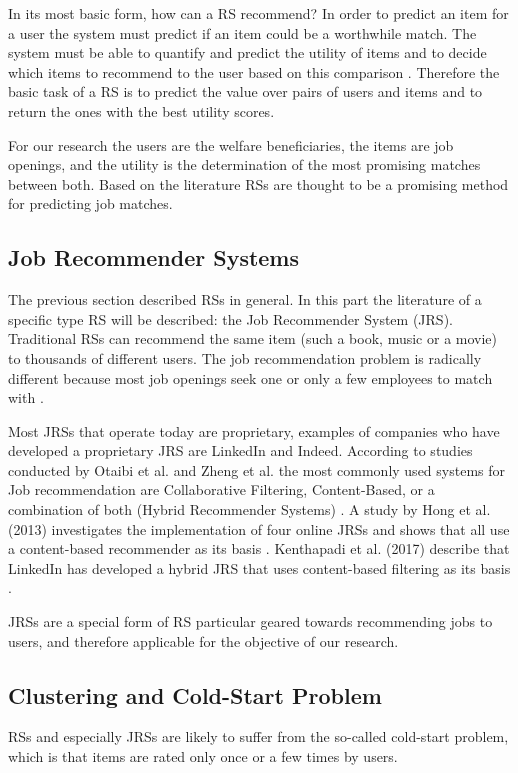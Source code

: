 In its most basic form, how can a RS recommend? 
In order to predict an item for a user the system must predict if an item could be a worthwhile match. 
The system must be able to quantify and predict the utility of items and to decide which items to recommend to the user based on this comparison \cite{2015RecommenderHandbook}. 
Therefore the basic task of a RS is to predict the value over pairs of users and items and to return the ones with the best utility scores.

For our research the users are the welfare beneficiaries, the items are job openings, and the utility is the determination of the most promising matches between both.
Based on the literature RSs are thought to be a promising method for predicting job matches.


\subsection{Job Recommender Systems}
\label{sec:jrs}
The previous section described RSs in general. 
In this part the literature of a specific type RS will be described: the Job Recommender System (JRS).
Traditional RSs can recommend the same item (such a book, music or a movie) to thousands of different users. 
The job recommendation problem is radically different because most job openings seek one or only a few employees to match with \cite{kenthapadi2017personalized}.

Most JRSs that operate today are proprietary, examples of companies who have developed a proprietary JRS are LinkedIn and Indeed.
According to studies conducted by Otaibi et al. and Zheng et al. the most commonly used  systems for Job recommendation are Collaborative Filtering, Content-Based, or a combination of both (Hybrid Recommender Systems) \cite{T.Al-Otaibi2012ASystems} \cite{Zheng2012JobSurvey}.
A study by Hong et al. (2013) investigates the implementation of four online JRSs and shows that all use a content-based recommender as its basis \cite{hong2013job}.
Kenthapadi et al. (2017) describe that LinkedIn has developed a hybrid JRS that uses content-based filtering as its basis \cite{kenthapadi2017personalized}.

JRSs are a special form of RS particular geared towards recommending jobs to users, and therefore applicable for the objective of our research. 

\subsection{Clustering and Cold-Start Problem}
\label{sec:ccs}
RSs and especially JRSs are likely to suffer from the so-called cold-start problem, which is that items are rated only once or a few times by users.

